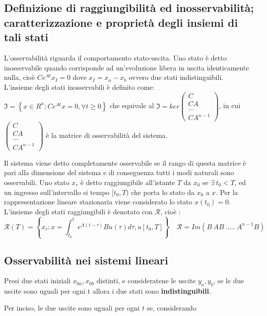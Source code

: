 \documentclass{article}
\begin{document}
\subsection{Definizione di raggiungibilità ed inosservabilità; caratterizzazione e proprietà degli insiemi di tali stati}
L'osservabilità riguarda il comportamento stato-uscita.
Uno stato è detto inosservabile quando corrisponde ad un'evoluzione libera in uscita identicamente nulla,
cioè $Ce^{At}x_I=0$ dove $x_I=x_a-x_b$ ovvero due stati indistinguibili.
L'insieme degli stati inosservabili è definito come:
$\mathfrak{I} =\left\{ x \in R^n ; Ce^{At}x=0 , \forall t \geq 0 \right\}$ che equivale al 
$\mathfrak{I}=ker \begin{pmatrix}C\\CA\\...\\CA^{n-1}\end{pmatrix}$,
in cui $\begin{pmatrix}C\\CA\\...\\CA^{n-1}\end{pmatrix}$ è la matrice di osservabilità del sistema.

Il sistema viene detto completamente osservabile se il rango di questa matrice è pari alla dimensione del sistema
e di conseguenza tutti i modi naturali sono osservabili.
Uno stato $x_r$ è detto raggiungibile all'istante $T$ da $x_0$ se $\exists\ t_0<T$, ed un ingresso sull'intervallo si tempo $[t_0,T)$
che porta lo stato da $x_0$ a $x$.
Per la rappresentazione lineare stazionaria viene considerato lo stato $x(t_0)=0$. 
L'insieme degli stati raggiungibili è denotato con $\mathcal{R}$, cioè :
\[ \mathcal{R}(T)=\left\{x_r : x=\int_{t_0}^{t}e^{A(t-\tau)}Bu(\tau)d\tau, u[t_0,T]\right\}
\quad \mathcal{R}=
Im(B\ AB\ .....\ A^{n-1}B)\]




\subsection{Osservabilità nei sistemi lineari}
Presi due stati iniziali $x_{0a},x_{0b}$ distinti, e consideratene le uscite $y_a,y_b$, se le due uscite 
sono uguali per ogni t allora i due stati sono \textbf{indistinguibili}.

Per inciso, le due uscite sono uguali per ogni $t$ se,
considerando 
\end{document}
